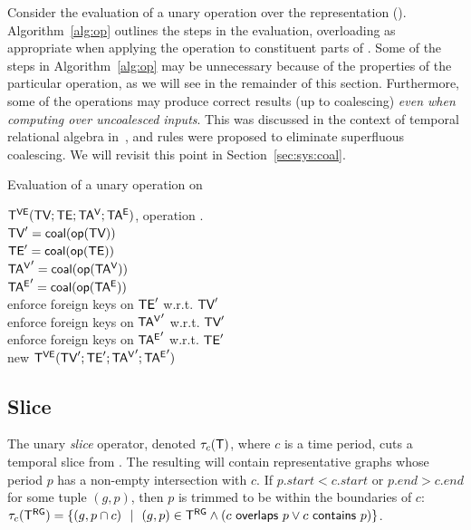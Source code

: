 Consider the evaluation of a unary operation \opp over the \ve
representation \opp(\tve).  Algorithm~\ref{alg:op} outlines the steps
in the evaluation, overloading \opp as appropriate when applying the
operation to constituent parts of \tve.  Some of the steps in
Algorithm~\ref{alg:op} may be unnecessary because of the properties of
the particular operation, as we will see in the remainder of this
section.  Furthermore, some of the operations may produce correct
results (up to coalescing) {\em even when computing over uncoalesced
  inputs}.  This was discussed in the context of temporal relational
algebra in~\cite{DBLP:conf/vldb/BohlenSS96}, and rules were proposed
to eliminate superfluous coalescing. We will revisit this point in
Section~\ref{sec:sys:coal}.

\begin{algorithm}[h!]
\caption{Evaluation of a unary operation \opp on \tve}
\begin{algorithmic}[1]
\REQUIRE \tg $\mathsf{T^{VE}} (\textsf{TV}; \textsf{TE}; \mathsf{TA^{V}}; \mathsf{TA^{E}})$, operation .\\
\STATE  $\textsf{TV}' = \textsf{coal} (\textsf{op}(\textsf{TV}))$\\
\STATE  $\textsf{TE}' = \textsf{coal} (\textsf{op}(\textsf{TE}))$\\
\STATE  $\mathsf{TA^{V}}' = \textsf{coal} (\textsf{op}(\mathsf{TA^{V}}))$\\
\STATE  $\mathsf{TA^{E}}' = \textsf{coal} (\textsf{op}(\mathsf{TA^{E}}))$\\
\STATE  enforce foreign keys on $\textsf{TE}'$ w.r.t. $\textsf{TV}'$\\
\STATE  enforce foreign keys on $\mathsf{TA^{V}}'$ w.r.t. $\textsf{TV}'$\\
\STATE  enforce foreign keys on $\mathsf{TA^{E}}'$ w.r.t. $\textsf{TE}'$\\
\RETURN new $\mathsf{T^{VE}} (\textsf{TV}';\textsf{TE}';\mathsf{TA^{V}}';\mathsf{TA^{E}}')$\\
\end{algorithmic}
\label{alg:op}
\end{algorithm}

\subsection{Slice}
\label{sec:algebra:slice}

The unary {\em slice} operator, denoted $\tau_c (\mathsf{T})$, where $c$ is
a time period, cuts a temporal slice from \ttt.  The resulting \tg
will contain representative graphs whose period $p$ has a non-empty
intersection with $c$.  If $p.start < c.start$ or $p.end > c.end$ for
some tuple $(g, p)$, then $p$ is trimmed to be within the boundaries
of $c$: $\tau_c (\mathsf{T^{RG}}) = \{ (g, p \cap c)~~|~~(g, p) \in \mathsf{T^{RG}} \wedge
(c~\mathsf{overlaps}~p \vee c~\mathsf{contains}~p)\}$.

